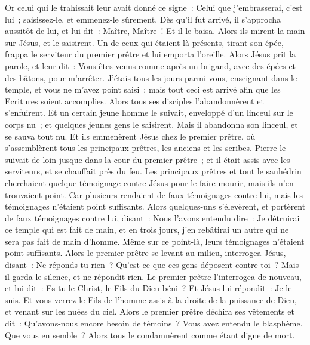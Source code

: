 \begin{multicols}{2}
Or celui qui le trahissait leur avait donné ce signe~: Celui que j'embrasserai, c'est lui~; saisissez-le, et emmenez-le sûrement.
Dès qu'il fut arrivé, il s'approcha aussitôt de lui, et lui dit~: Maître, Maître~! Et il le baisa.
Alors ils mirent la main sur Jésus, et le saisirent.
Un de ceux qui étaient là présents, tirant son épée, frappa le serviteur du premier prêtre et lui emporta l'oreille.
Alors Jésus prit la parole, et leur dit~: Vous êtes venus comme après un brigand, avec des épées et des bâtons, pour m'arrêter.
J'étais tous les jours parmi vous, enseignant dans le temple, et vous ne m'avez point saisi~; mais tout ceci est arrivé afin que les Ecritures soient accomplies.
Alors tous ses disciples l'abandonnèrent et s'enfuirent.
Et un certain jeune homme le suivait, enveloppé d'un linceul sur le corps nu~; et quelques jeunes gens le saisirent.
Mais il abandonna son linceul, et se sauva tout nu.
Et ils emmenèrent Jésus chez le premier prêtre, où s'assemblèrent tous les principaux prêtres, les anciens et les scribes.
Pierre le suivait de loin jusque dans la cour du premier prêtre~; et il était assis avec les serviteurs, et se chauffait près du feu.
Les principaux prêtres et tout le sanhédrin cherchaient quelque témoignage contre Jésus pour le faire mourir, mais ils n'en trouvaient point.
Car plusieurs rendaient de faux témoignages contre lui, mais les témoignages n'étaient point suffisants.
Alors quelques-uns s'élevèrent, et portèrent de faux témoignages contre lui, disant~:
Nous l'avons entendu dire~: Je détruirai ce temple qui est fait de main, et en trois jours, j'en rebâtirai un autre qui ne sera pas fait de main d'homme.
Même sur ce point-là, leurs témoignages n'étaient point suffisants.
Alors le premier prêtre se levant au milieu, interrogea Jésus, disant~: Ne réponds-tu rien~? Qu'est-ce que ces gens déposent contre toi~?
Mais il garda le silence, et ne répondit rien. Le premier prêtre l'interrogea de nouveau, et lui dit~: Es-tu le Christ, le Fils du Dieu béni~?
Et Jésus lui répondit~: Je le suis. Et vous verrez le Fils de l'homme assis à la droite de la puissance de Dieu, et venant sur les nuées du ciel.
Alors le premier prêtre déchira ses vêtements et dit~: Qu'avons-nous encore besoin de témoins~?
Vous avez entendu le blasphème. Que vous en semble~? Alors tous le condamnèrent comme étant digne de mort.

\end{multicols}
